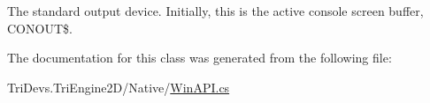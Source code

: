 The standard output device. Initially, this is the active console screen buffer, C\-O\-N\-O\-U\-T\$. 



The documentation for this class was generated from the following file\-:\begin{DoxyCompactItemize}
\item 
Tri\-Devs.\-Tri\-Engine2\-D/\-Native/\hyperlink{_win_a_p_i_8cs}{Win\-A\-P\-I.\-cs}\end{DoxyCompactItemize}
